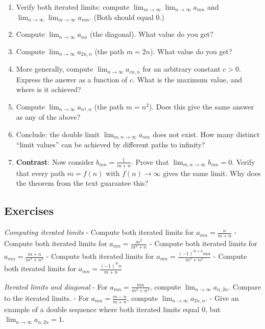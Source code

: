 \documentclass[
  10pt,
  letterpaper,
]{scrbook}
\begin{document}
\begin{enumerate}
\def\labelenumi{(\alph{enumi})}
\item
  Verify both iterated limits: compute
  \(\lim_{m \to \infty} \lim_{n \to \infty} a_{mn}\) and
  \(\lim_{n \to \infty} \lim_{m \to \infty} a_{mn}\). (Both should equal
  \(0\).)
\item
  Compute \(\lim_{n \to \infty} a_{nn}\) (the diagonal). What value do
  you get?
\item
  Compute \(\lim_{n \to \infty} a_{2n, n}\) (the path \(m = 2n\)). What
  value do you get?
\item
  More generally, compute \(\lim_{n \to \infty} a_{cn, n}\) for an
  arbitrary constant \(c > 0\). Express the answer as a function of
  \(c\). What is the maximum value, and where is it achieved?
\item
  Compute \(\lim_{n \to \infty} a_{n^2, n}\) (the path \(m = n^2\)).
  Does this give the same answer as any of the above?
\item
  Conclude: the double limit \(\lim_{m,n \to \infty} a_{mn}\) does not
  exist. How many distinct ``limit values'' can be achieved by different
  paths to infinity?
\item
  \textbf{Contrast}: Now consider \(b_{mn} = \frac{1}{m+n}\). Prove that
  \(\lim_{m,n \to \infty} b_{mn} = 0\). Verify that every path
  \(m = f(n)\) with \(f(n) \to \infty\) gives the same limit. Why does
  the theorem from the text guarantee this?
\end{enumerate}

\subsection{Exercises}\label{exercises-21}

\emph{Computing iterated limits} - Compute both iterated limits for
\(a_{mn} = \frac{n}{m + n}\) - Compute both iterated limits for
\(a_{mn} = \frac{m^2}{m^2 + n}\) - Compute both iterated limits for
\(a_{mn} = \frac{m + n}{m^2 + n^2}\) - Compute both iterated limits for
\(a_{mn} = \frac{(-1)^{m+n} mn}{m^2 + n^2}\) - Compute both iterated
limits for \(a_{mn} = \frac{(-1)^m n}{m + n}\)

\emph{Iterated limits and diagonal} - For
\(a_{mn} = \frac{mn}{m^2 + n^2}\), compute
\(\lim_{n \to \infty} a_{n, 2n}\). Compare to the iterated limits. - For
\(a_{mn} = \frac{m - n}{m + n}\), compute
\(\lim_{n \to \infty} a_{2n, n}\). - Give an example of a double
sequence where both iterated limits equal \(0\), but
\(\lim_{n \to \infty} a_{n, 2n} = 1\).
\end{document}
